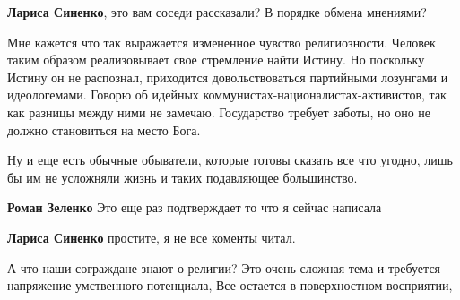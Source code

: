 \begin{itemize}
\begin{itemize}
\textbf{Лариса Синенко}, это вам соседи рассказали? В порядке обмена мнениями?
\end{itemize}

 

Мне кажется что так выражается измененное чувство религиозности. Человек таким
образом реализовывает свое стремление найти Истину. Но поскольку Истину он не
распознал, приходится довольствоваться партийными лозунгами и идеологемами.
Говорю об идейных коммунистах-националистах-активистов, так как разницы между
ними не замечаю. Государство требует заботы, но оно не должно становиться на
место Бога.

Ну и еще есть обычные обыватели, которые готовы сказать все что угодно, лишь бы
им не усложняли жизнь и таких подавляющее большинство.

\begin{itemize}
 
\textbf{Роман Зеленко} Это еще раз подтверждает то что я сейчас написала

 
\textbf{Лариса Синенко} простите, я не все коменты читал.
\end{itemize}

 

А что наши сограждане знают о религии? Это очень сложная тема и требуется
напряжение умственного потенциала, Все остается в поверхностном восприятии,


 


\end{itemize}
